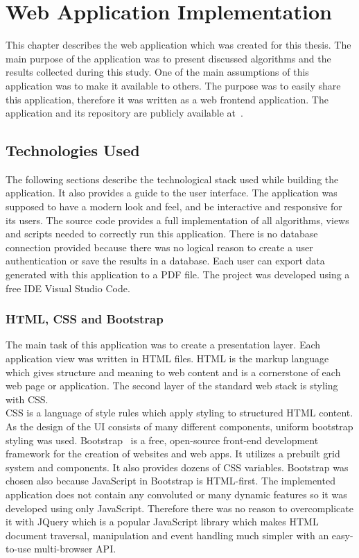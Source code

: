 \chapter{Web Application Implementation}%
This chapter describes the web application which was created for this thesis. The main purpose of the application was to present discussed algorithms
and the results collected during this study. One of the main assumptions of this application was to make it available to others. The purpose was to
easily share this application, therefore it was written as a web frontend application. The application and its repository are publicly available at~\cite{26, 27}.
\section{Technologies Used}
The following sections describe the technological stack used while building the application. It also provides a guide to the user interface. The application 
was supposed to have a modern look and feel, and be interactive and responsive for its users. The source code \cite{27} provides a full implementation of all algorithms,
views and scripts needed to correctly run this application. There is no database connection provided because there was no logical reason to create a user
authentication or save the results in a database. Each user can export data generated with this application to a PDF file. The project was developed using a free
IDE Visual Studio Code.
\subsection{HTML, CSS and Bootstrap}
The main task of this application was to create a presentation layer. Each application view was written in HTML files. HTML is the markup language which
gives structure and meaning to web content and is a cornerstone of each web page or application. The second layer of the standard web stack is styling with CSS.\\
CSS is a language of style rules which apply styling to structured HTML content. As the design of the UI consists of many different components, uniform
bootstrap styling was used. Bootstrap~\cite{28} is a free, open-source front-end development framework for the creation of websites and web apps. It utilizes a prebuilt
grid system and components. It also provides dozens of CSS variables. Bootstrap was chosen also because JavaScript in Bootstrap is HTML-first. The implemented 
application does not contain any convoluted or many dynamic features so it was developed using only JavaScript. Therefore there was no reason to overcomplicate it
with JQuery which is a popular JavaScript library which makes HTML document traversal, manipulation and event handling much simpler with an easy-to-use multi-browser API.%
